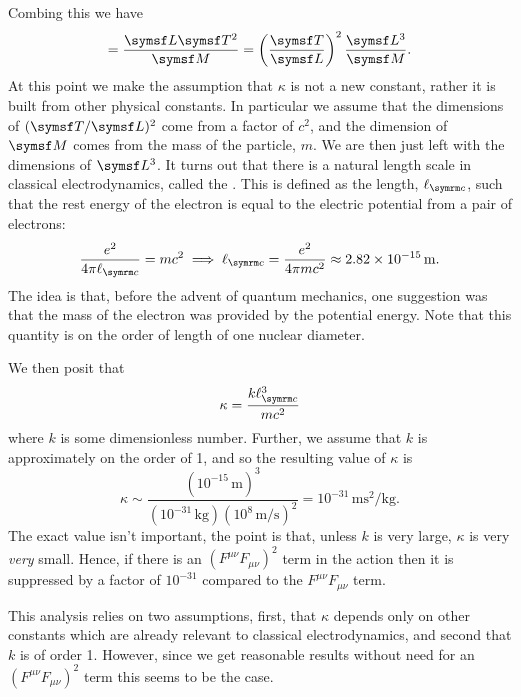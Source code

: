 Combing this we have
\begin{equation}
    [\kappa] = \frac{\dimension{L}\dimension{T}^2}{\dimension{M}} = \left( \frac{\dimension{T}}{\dimension{L}} \right)^2 \frac{\dimension{L}^3}{\dimension{M}}.
\end{equation}
At this point we make the assumption that \(\kappa\) is not a new constant, rather it is built from other physical constants.
In particular we assume that the dimensions of \((\dimension{T}/\dimension{L})^2\) come from a factor of \(c^2\), and the dimension of \(\dimension{M}\) comes from the mass of the particle, \(m\).
We are then just left with the dimensions of \(\dimension{L}^3\).
It turns out that there is a natural length scale in classical electrodynamics, called the .
This is defined as the length, \(\classicalElectronRadius\), such that the rest energy of the electron is equal to the electric potential from a pair of electrons:
\begin{equation}
    \frac{e^2}{4\pi\classicalElectronRadius} = mc^2 \implies \classicalElectronRadius = \frac{e^2}{4\pi mc^2} \approx \qty{2.82e-15}{\metre}.
\end{equation}
The idea is that, before the advent of quantum mechanics, one suggestion was that the mass of the electron was provided by the potential energy.
Note that this quantity is on the order of length of one nuclear diameter.

We then posit that
\begin{equation}
    \kappa = \frac{k\classicalElectronRadius^3}{mc^2}
\end{equation}
where \(k\) is some dimensionless number.
Further, we assume that \(k\) is approximately on the order of 1, and so the resulting value of \(\kappa\) is
\begin{equation}
    \kappa \sim \frac{(10^{-15}\,\unit{\metre})^3}{(10^{-31}\,\unit{\kilogram})(10^{8} \,\unit{\metre\per\second})^2} = 10^{-31}\,\unit{\metre\second\squared\per\kilogram}.
\end{equation}
The exact value isn't important, the point is that, unless \(k\) is very large, \(\kappa\) is very \emph{very} small.
Hence, if there is an \((F^{\mu\nu}F_{\mu\nu})^2\) term in the action then it is suppressed by a factor of \(10^{-31}\) compared to the \(F^{\mu\nu}F_{\mu\nu}\) term.

This analysis relies on two assumptions, first, that \(\kappa\) depends only on other constants which are already relevant to classical electrodynamics, and second that \(k\) is of order 1.
However, since we get reasonable results without need for an \((F^{\mu\nu}F_{\mu\nu})^2\) term this seems to be the case.

